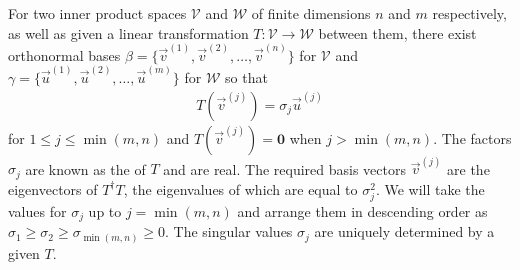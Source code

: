 \begin{thm}
\label{thm:SVDtrans}
For two inner product spaces $\mathcal{V}$ and $\mathcal{W}$ of finite dimensions $n$ and $m$ respectively, as well as given a linear transformation $T: \mathcal{V} \to \mathcal{W}$ between them, there exist orthonormal bases $\beta = \{\vec{v}^{(1)}, \vec{v}^{(2)},\ldots,\vec{v}^{(n)}\}$ for $\mathcal{V}$ and $\gamma = \{\vec{u}^{(1)}, \vec{u}^{(2)},\ldots,\vec{u}^{(m)}\}$ for $\mathcal{W}$ so that 
\begin{align}
T(\vec{v}^{(j)}) = \sigma_j \vec{u}^{(j)} \label{eqn:SVDT}
\end{align}
for $1\leq j \leq \min(m,n)$ and $T(\vec{v}^{(j)}) = \textbf{0}$ when $j > \min(m,n)$. The factors $\sigma_j$ are known as the  of $T$ and are real. The required basis vectors $\vec{v}^{(j)}$ are the eigenvectors of $T^\dag T$, the eigenvalues of which are equal to $\sigma_j^2$. We will take the values for $\sigma_j$ up to $j = \min(m,n)$ and arrange them in descending order as $\sigma_1 \geq \sigma_2 \geq \sigma_{\min(m,n)} \geq 0$. The singular values $\sigma_j$ are uniquely determined by a given $T$.
\end{thm}
